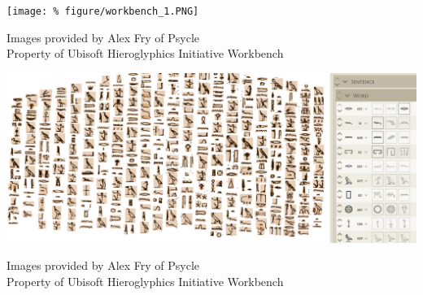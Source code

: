 \documentclass[unknownkeysallowed,usepdftitle=false, parskip=full, aspectratio=1610]{beamer}
\newcommand{\secvariable}{nothing}
\newcommand{\mysection}[1]{\renewcommand{\secvariable}{#1}
}
\begin{document}
\mysection{radar}
\begin{frame}\label{\secvariable}

\texttt{[image: \%
figure/workbench\_1.PNG]}
\vfill
\parbox{\linewidth}{\tiny Images provided by Alex Fry of Psycle
\\Property of Ubisoft Hieroglyphics Initiative Workbench}

\end{frame}

\mysection{line}

\begin{frame}\label{\secvariable}

\begin{center}
  \vspace{-0.5cm}

\includegraphics[width=1\textwidth,keepaspectratio]{figure/PICO_36.png}
\end{center}
\vfill
\parbox{\linewidth}{\tiny Images provided by Alex Fry of Psycle
\\Property of Ubisoft Hieroglyphics Initiative Workbench}

\end{frame}

\mysection{major}
\end{document}
